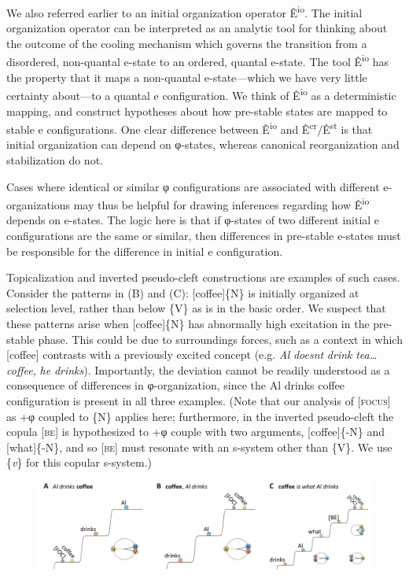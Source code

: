   We also referred earlier to an initial organization operator Ê\textsuperscript{io}. The initial organization operator can be interpreted as an analytic tool for thinking about the outcome of the cooling mechanism which governs the transition from a disordered, non-quantal e-state to an ordered, quantal e-state. The tool Ê\textsuperscript{io} has the property that it maps a non-quantal e-state—which we have very little certainty about—to a quantal e configuration. We think of Ê\textsuperscript{io} as a deterministic mapping, and construct hypotheses about how pre-stable states are mapped to stable e configurations. One clear difference between Ê\textsuperscript{io} and Ê\textsuperscript{cr}/Ê\textsuperscript{st} is that initial organization can depend on φ-states, whereas canonical reorganization and stabilization do not. 

  Cases where identical or similar φ configurations are associated with different e-organizations may thus be helpful for drawing inferences regarding how Ê\textsuperscript{io} depends on e-states. The logic here is that if φ-states of two different initial e configurations are the same or similar, then differences in pre-stable e-states must be responsible for the difference in initial e configuration. 

  Topicalization and inverted pseudo-cleft constructions are examples of such cases. Consider the patterns in (B) and (C): [coffee]\{N\} is initially organized at selection level, rather than below \{V\} as is in the basic order. We suspect that these patterns arise when [coffee]\{N\} has abnormally high excitation in the pre-stable phase. This could be due to surroundings forces, such as a context in which [coffee] contrasts with a previously excited concept (e.g. \textit{Al} \textit{doesnt} \textit{drink} \textit{tea…coffee,} \textit{he} \textit{drinks}). Importantly, the deviation cannot be readily understood as a consequence of differences in φ-organization, since the {\textbar}Al drinks coffee{\textbar} configuration is present in all three examples. (Note that our analysis of [\textsc{focus}] as +φ coupled to \{N\} applies here; furthermore, in the inverted pseudo-cleft the copula [\textsc{be}] is hypothesized to +φ couple with two arguments, [coffee]\{-N\} and [what]\{-N\}, and so [\textsc{be}] must resonate with an s-system other than \{V\}. We use \{\textit{v}\} for this copular s-system.)

  
\begin{figure}
\includegraphics[width=\textwidth]{figures/Tilsen-img78.png}
\caption{\missingcaption}
\label{fig:}
\end{figure}
 


